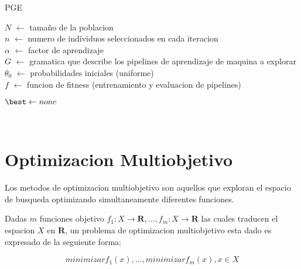 \begin{algorithm}[htb!]
    \caption{PGE\label{algorithm:pge}}

    $N$ $\leftarrow$ tamaño de la poblacion \\
    $n$ $\leftarrow$ numero de individuos seleccionados en cada iteracion \\
    $\alpha$ $\leftarrow$ factor de aprendizaje \\
    $G$ $\leftarrow$ gramatica que describe los pipelines de aprendizaje de maquina a explorar \\
    $\theta_0$ $\leftarrow$ probabilidades iniciales (uniforme) \\
    $f$ $\leftarrow$ funcion de fitness (entrenamiento y evaluacion de pipelines) \\


    $\best \leftarrow none$

    \Return{\best} \\
\end{algorithm}


\section{Optimizacion Multiobjetivo}\label{section:multiobjective}

Los metodos de optimizacion multiobjetivo son aquellos que exploran el espacio de busqueda optimizando simultaneamente diferentes funciones.

\begin{definition}
\label{definition:multiobjective}

    Dadas $m$ funciones objetivo $f_1: X \rightarrow \mathbf{R}, \dots, f_m: X \rightarrow \mathbf{R}$ las cuales traducen el espacion $X$ en $\mathbf{R}$, un problema de optimizacion multiobjetivo esta dado es expresado de la seguiente forma:

    \begin{equation}
        minimizar f_1(x), \dots, minimizar f_m(x), x \in X
    \end{equation}
\end{definition}

